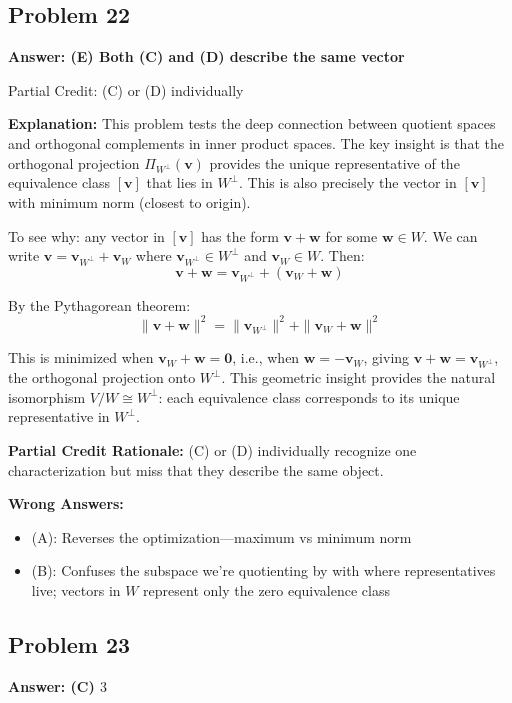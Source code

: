 \documentclass[12pt]{amsart}
\newcommand{\correct}[1]{{\color{correctgreen}\textbf{#1}}}
\newcommand{\partcred}[1]{{\color{partialblue}#1}}
\begin{document}
{\subsection*{Problem 22}
\correct{Answer: (E) Both (C) and (D) describe the same vector}

\partcred{Partial Credit: (C) or (D) individually}

\textbf{Explanation:} This problem tests the deep connection between quotient spaces and orthogonal complements in inner product spaces. The key insight is that the orthogonal projection $\Pi_{W^{\perp}}(\mathbf{v})$ provides the unique representative of the equivalence class $[\mathbf{v}]$ that lies in $W^{\perp}$. This is also precisely the vector in $[\mathbf{v}]$ with minimum norm (closest to origin).

To see why: any vector in $[\mathbf{v}]$ has the form $\mathbf{v} + \mathbf{w}$ for some $\mathbf{w} \in W$. We can write $\mathbf{v} = \mathbf{v}_{W^{\perp}} + \mathbf{v}_W$ where $\mathbf{v}_{W^{\perp}} \in W^{\perp}$ and $\mathbf{v}_W \in W$. Then:
$$\mathbf{v} + \mathbf{w} = \mathbf{v}_{W^{\perp}} + (\mathbf{v}_W + \mathbf{w})$$

By the Pythagorean theorem:
$$\|\mathbf{v} + \mathbf{w}\|^2 = \|\mathbf{v}_{W^{\perp}}\|^2 + \|\mathbf{v}_W + \mathbf{w}\|^2$$

This is minimized when $\mathbf{v}_W + \mathbf{w} = \mathbf{0}$, i.e., when $\mathbf{w} = -\mathbf{v}_W$, giving $\mathbf{v} + \mathbf{w} = \mathbf{v}_{W^{\perp}}$, the orthogonal projection onto $W^{\perp}$. This geometric insight provides the natural isomorphism $V/W \cong W^{\perp}$: each equivalence class corresponds to its unique representative in $W^{\perp}$.

\textbf{Partial Credit Rationale:} (C) or (D) individually recognize one characterization but miss that they describe the same object.

\textbf{Wrong Answers:}
\begin{itemize}
\item (A): Reverses the optimization—maximum vs minimum norm
\item (B): Confuses the subspace we're quotienting by with where representatives live; vectors in $W$ represent only the zero equivalence class
\end{itemize}

\subsection*{Problem 23}
\correct{Answer: (C) $3$}

}
\end{document}
